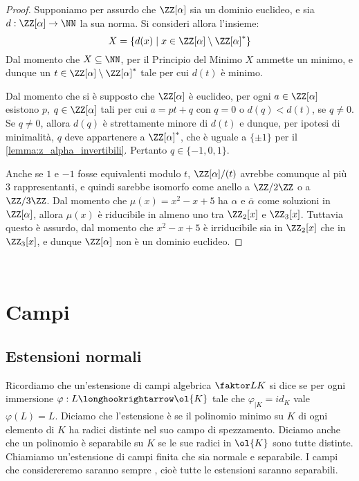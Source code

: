 \documentclass[11pt]{scrartcl}
\begin{document}
	\begin{proof}
		Supponiamo per assurdo che $\ZZ[\alpha]$ sia un dominio euclideo, e
		sia $d : \ZZ[\alpha] \to \NN$ la sua norma. Si consideri allora
		l'insieme:
		\[ X = \{ d(x) \mid x \in \ZZ[\alpha] \setminus \ZZ[\alpha]^* \} \]
		Dal momento che $X \subseteq \NN$, per il Principio del Minimo $X$
		ammette un minimo, e dunque un $t \in \ZZ[\alpha] \setminus \ZZ[\alpha]^*$
		tale per cui $d(t)$ è minimo. \medskip
		
		
		Dal momento che si è supposto che $\ZZ[\alpha]$ è euclideo, per
		ogni $a \in \ZZ[\alpha]$ esistono
		$p$, $q \in \ZZ[\alpha]$ tali per cui $a = p t + q$ con
		$q = 0$ o $d(q) < d(t)$, se $q \neq 0$. Se $q \neq 0$, allora
		$d(q)$ è strettamente minore di $d(t)$ e dunque, per ipotesi di minimalità,
		$q$ deve appartenere a $\ZZ[\alpha]^*$, che è uguale a $\{\pm 1\}$ per
		il \autoref{lemma:z_alpha_invertibili}. Pertanto
		$q \in \{-1, 0, 1\}$. \medskip
		
		
		Anche se $1$ e $-1$ fosse equivalenti modulo $t$, $\ZZ[\alpha]/(t)$ avrebbe
		comunque al più $3$ rappresentanti, e quindi sarebbe isomorfo come anello
		a $\ZZ/2\ZZ$ o a $\ZZ/3\ZZ$. Dal momento che $\mu(x) = x^2 - x + 5$ ha $\alpha$
		e $\overline{\alpha}$ come
		soluzioni in $\ZZ[\alpha]$, allora $\mu(x)$ è riducibile in almeno uno tra
		$\ZZ_2[x]$ e $\ZZ_3[x]$. Tuttavia questo è assurdo, dal momento
		che $x^2 - x + 5$ è irriducibile sia in $\ZZ_2[x]$ che in $\ZZ_3[x]$,
		e dunque $\ZZ[\alpha]$ non è un dominio euclideo.		
	\end{proof}

	\newpage
	\ %
	\newpage
	
	\section{Campi}
	
	\subsection{Estensioni normali}
	
	Ricordiamo che un'estensione di campi algebrica $\faktor L K$ si dice 
	 se per ogni immersione $\varphi: L\longhookrightarrow \ol{K}$
	tale che $\varphi_{\mid K} = id_K$ vale $\varphi(L) = L$. Diciamo che 
	l'estensione è  se il polinomio minimo su $K$ di ogni elemento
	di $K$ ha radici distinte nel suo campo di spezzamento. Diciamo anche che un 
	polinomio è separabile su $K$ se le sue radici in $\ol{K}$ sono tutte distinte. 
	Chiamiamo  un'estensione di campi finita che sia 
	normale e separabile. I campi che considereremo saranno sempre ,
	cioè tutte le estensioni saranno separabili.
	
\end{document}
